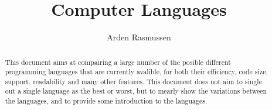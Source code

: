 \documentclass[10pt]{article}
\title{Computer Languages}
\author{Arden Rasmussen}
\begin{document}
\maketitle
\newpage

\begin{abstract}\label{abstract}
   This document aims at compairing a large number of the posible different
   programming languages that are currently avalible, for both their
   efficiency, code size, support, readability and many other features. This
   document does not aim to single out a single language as the best or worst,
   but to mearly show the variations between the languages, and to provide some
   introduction to the languages.
\end{abstract}

\newpage
\tableofcontents
\newpage
{}


















\end{document}

